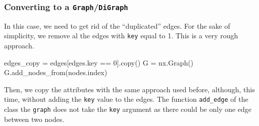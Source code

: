 \documentclass[
  letterpaper,
  DIV=11,
  numbers=noendperiod]{scrreprt}
\newenvironment{Shaded}{\begin{snugshade}}{\end{snugshade}}
\newcommand{\DecValTok}[1]{\textcolor[rgb]{0.68,0.00,0.00}{#1}}
\newcommand{\NormalTok}[1]{\textcolor[rgb]{0.00,0.23,0.31}{#1}}
\newcommand{\OperatorTok}[1]{\textcolor[rgb]{0.37,0.37,0.37}{#1}}
\begin{document}
\hypertarget{converting-to-a-graphdigraph}{%
\subsubsection{\texorpdfstring{Converting to a
\texttt{Graph}/\texttt{DiGraph}}{Converting to a Graph/DiGraph}}\label{converting-to-a-graphdigraph}}

In this case, we need to get rid of the ``duplicated'' edges. For the
sake of simplicity, we remove al the edges with \texttt{key} equal to 1.
This is a very rough approach.

\begin{Shaded}
\begin{Highlighting}[]
\NormalTok{edges\_copy }\OperatorTok{=}\NormalTok{ edges[edges.key }\OperatorTok{==} \DecValTok{0}\NormalTok{].copy()}
\NormalTok{G }\OperatorTok{=}\NormalTok{ nx.Graph()   }
\NormalTok{G.add\_nodes\_from(nodes.index)}
\end{Highlighting}
\end{Shaded}

Then, we copy the attributes with the same approach used before,
although, this time, without adding the \texttt{key} value to the edges.
The function \texttt{add\_edge} of the class the \texttt{graph} does not
take the \texttt{key} argument as there could be only one edge between
two nodes.
\end{document}
